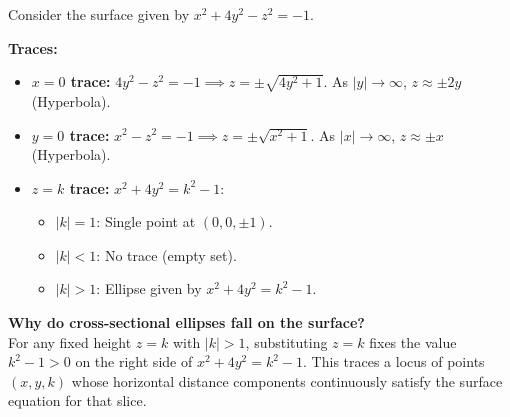 \begin{example}
Consider the surface given by $x^2 + 4y^2 - z^2 = -1$.

\textbf{Traces:}
\begin{itemize}
    \item \textbf{$x = 0$ trace:} $4y^2 - z^2 = -1 \implies z = \pm\sqrt{4y^2 + 1}$. As $|y| \to \infty$, $z \approx \pm 2y$ (Hyperbola).
    \item \textbf{$y = 0$ trace:} $x^2 - z^2 = -1 \implies z = \pm\sqrt{x^2 + 1}$. As $|x| \to \infty$, $z \approx \pm x$ (Hyperbola).
    \item \textbf{$z = k$ trace:} $x^2 + 4y^2 = k^2 - 1$:
    \begin{itemize}
        \item $|k| = 1$: Single point at $(0, 0, \pm 1)$.
        \item $|k| < 1$: No trace (empty set).
        \item $|k| > 1$: Ellipse given by $x^2 + 4y^2 = k^2 - 1$.
    \end{itemize}
\end{itemize}

\begin{center}
\end{center}

\textbf{Why do cross-sectional ellipses fall on the surface?} \\
For any fixed height $z = k$ with $|k| > 1$, substituting $z = k$ fixes the value $k^2 - 1 > 0$ on the right side of $x^2 + 4y^2 = k^2 - 1$. This traces a locus of points $(x,y,k)$ whose horizontal distance components continuously satisfy the surface equation for that slice.
\end{example}



